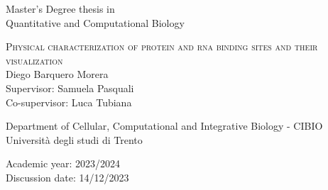 \pagestyle{empty}
\begin{center}
  \begin{figure}[h!]
    \centerline{}
  \end{figure}

  \vspace{1 cm}
  \Large{Master's Degree thesis in\\Quantitative and Computational Biology\\}
  \vspace{1 cm}

  \LARGE\textsc{Physical characterization of protein and rna binding sites and their visualization\\}
  \vspace{0.5 cm}
  \LARGE{Diego Barquero Morera\\}
  \vspace{0.5 cm}
  \Large{Supervisor: Samuela Pasquali\\}
  \Large{Co-supervisor: Luca Tubiana\\}

  \vspace{2 cm}
  \Large{Department of Cellular, Computational and Integrative Biology - CIBIO\\}
  \Large{Università degli studi di Trento}
  \vspace{0.5 cm}

  \Large{Academic year: 2023/2024}\\
  \Large{Discussion date: 14/12/2023}
\end{center}
\maketitle
